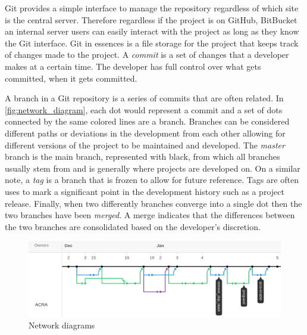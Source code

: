 \addtocounter{footnote}{1}


Git provides a simple interface to manage the repository regardless of which site is the central server. Therefore regardless if the project is on GitHub, BitBucket an internal server users can easily interact with the project as long as they know the Git interface. Git in essences is a file storage for the project that keeps track of changes made to the project. A \textit{commit} is a set of changes that a developer makes at a certain time. The developer has full control over what gets committed, when it gets committed.

A branch in a Git repository is a series of commits that are often related. In \autoref{fig:network_diagram}, each dot would represent a commit and a set of dots connected by the same colored lines are a branch. Branches can be considered different paths or deviations in the development from each other allowing for different versions of the project to be maintained and developed. The \textit{master} branch is the main branch, represented with black, from which all branches usually stem from and is generally where projects are developed on. On a similar note, a \textit{tag} is a branch that is frozen to allow for future reference. Tags are often uses to mark a significant point in the development history such as a project release. Finally, when two differently branches converge into a single dot then the two branches have been \textit{merged}. A merge indicates that the differences between the two branches are consolidated based on the developer's discretion.

\begin{figure}[!ht]
    \centering
        \includegraphics[width=1.0\textwidth]{images/network}
    \caption{Network diagrams}
    \label{fig:network_diagram}
\end{figure}

